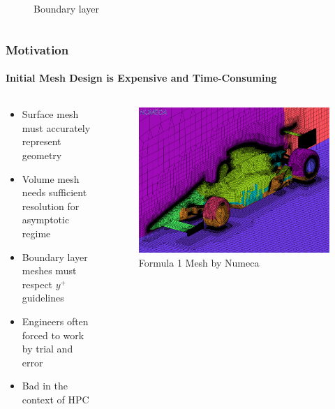 \documentclass[18pt,xcolor=table]{beamer}
\begin{document}
\begin{frame}[t]
\begin{columns}[c]
\begin{column}{.4\textwidth}
\begin{figure}
Boundary layer
\end{figure}
\end{column}
\end{columns}
\end{frame}  


\begin{frame}[t]
\frametitle{Motivation}
\framesubtitle{Initial Mesh Design is Expensive and Time-Consuming}
\begin{columns}[t]
\begin{column}[c]{0.4\textwidth}
\begin{itemize}
  \item Surface mesh must accurately represent geometry
  \item Volume mesh needs sufficient resolution for asymptotic regime
  \item Boundary layer meshes must respect $y^+$ guidelines
  \item Engineers often forced to work by trial and error
  \item Bad in the context of HPC
\end{itemize}
\end{column}
\begin{column}[c]{0.6\textwidth}
\vspace{2ex}
\begin{figure}[t]
\centering
\includegraphics[width=1.0\textwidth]{Motivation/NumecaRaceCar.png}
\\\small{Formula 1 Mesh by Numeca}\\
\end{figure}
\end{column}
\end{columns}
\end{frame}
\end{document}
